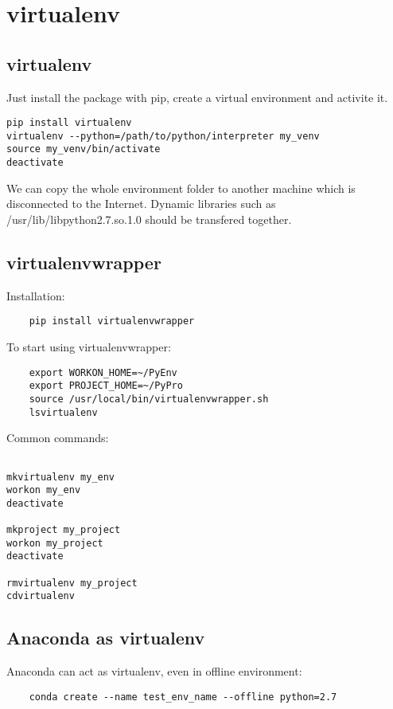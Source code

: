 \section{virtualenv}

\subsection{virtualenv}
Just install the package with pip, create a virtual environment and activite it.
\begin{verbatim}
pip install virtualenv
virtualenv --python=/path/to/python/interpreter my_venv
source my_venv/bin/activate
deactivate
\end{verbatim}

We can copy the whole environment folder to another machine which is disconnected to the Internet. 
Dynamic libraries such as /usr/lib/libpython2.7.so.1.0  should be transfered together.


\subsection{virtualenvwrapper}

Installation:
\begin{verbatim}
    pip install virtualenvwrapper
\end{verbatim}

To start using virtualenvwrapper:
\begin{verbatim}
    export WORKON_HOME=~/PyEnv
    export PROJECT_HOME=~/PyPro
    source /usr/local/bin/virtualenvwrapper.sh
    lsvirtualenv
\end{verbatim}



Common commands:
\begin{verbatim}
    
mkvirtualenv my_env
workon my_env
deactivate

mkproject my_project
workon my_project
deactivate

rmvirtualenv my_project
cdvirtualenv

\end{verbatim}


\subsection{Anaconda as virtualenv}

Anaconda can act as virtualenv, even in offline environment:
\begin{verbatim}
    conda create --name test_env_name --offline python=2.7
\end{verbatim}